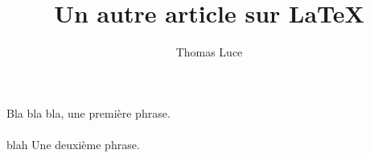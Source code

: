 \documentclass[11pt,a4paper]{article}
\title{Un autre article sur \LaTeX}
\author{Thomas Luce}
\date{}
\begin{document}
\maketitle




Bla bla bla, une première phrase.
\\
\\
blah
Une deuxième phrase.
\end{document}
